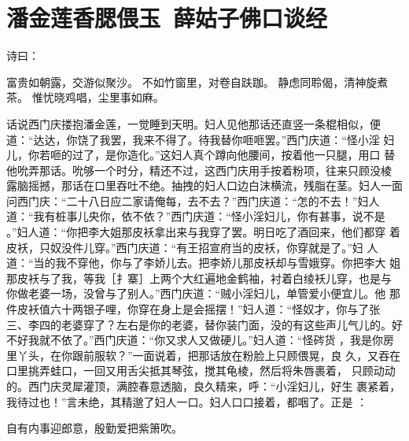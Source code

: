 \chapter{潘金莲香腮偎玉~薛姑子佛口谈经}

诗曰：

富贵如朝露，交游似聚沙。
不如竹窗里，对卷自趺跏。
静虑同聆偈，清神旋煮茶。
惟忧晓鸡唱，尘里事如麻。

话说西门庆搂抱潘金莲，一觉睡到天明。妇人见他那话还直竖一条棍相似，便
道：“达达，你饶了我罢，我来不得了。待我替你咂咂罢。”西门庆道：“怪小淫
妇儿，你若咂的过了，是你造化。”这妇人真个蹲向他腰间，按着他一只腿，用口
替他吮弄那话。吮够一个时分，精还不过，这西门庆用手按着粉项，往来只顾没棱
露脑摇撼，那话在口里吞吐不绝。抽拽的妇人口边白沫横流，残脂在茎。妇人一面
问西门庆：“二十八日应二家请俺每，去不去？”西门庆道：“怎的不去！”妇人
道：“我有桩事儿央你，依不依？”西门庆道：“怪小淫妇儿，你有甚事，说不是
。”妇人道：“你把李大姐那皮袄拿出来与我穿了罢。明日吃了酒回来，他们都穿
着皮袄，只奴没件儿穿。”西门庆道：“有王招宣府当的皮袄，你穿就是了。”妇
人道：“当的我不穿他，你与了李娇儿去。把李娇儿那皮袄却与雪娥穿。你把李大
姐那皮袄与了我，等我［扌寨］上两个大红遍地金鹤袖，衬着白绫袄儿穿，也是与
你做老婆一场，没曾与了别人。”西门庆道：“贼小淫妇儿，单管爱小便宜儿。他
那件皮袄值六十两银子哩，你穿在身上是会摇摆！”妇人道：“怪奴才，你与了张
三、李四的老婆穿了？左右是你的老婆，替你装门面，没的有这些声儿气儿的。好
不好我就不依了。”西门庆道：“你又求人又做硬儿。”妇人道：“怪硶货
，我是你房里丫头，在你跟前服软？”一面说着，把那话放在粉脸上只顾偎晃，良
久，又吞在口里挑弄蛙口，一回又用舌尖抵其琴弦，搅其龟棱，然后将朱唇裹着，
只顾动动的。西门庆灵犀灌顶，满腔春意透脑，良久精来，呼：“小淫妇儿，好生
裹紧着，我待过也！”言未绝，其精邈了妇人一口。妇人口口接着，都咽了。正是
：

自有内事迎郎意，殷勤爱把紫箫吹。

